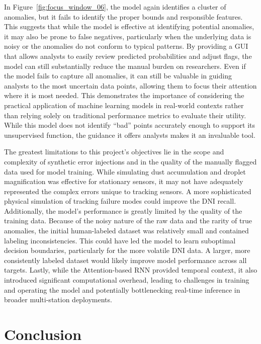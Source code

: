 \documentclass[12pt]{article}
\begin{document}
In Figure~\ref{fig:focus_window_06}, the model again identifies a cluster of anomalies, but it fails to identify the proper bounds and responsible features. This suggests that while the model is effective at identifying potential anomalies, it may also be prone to false negatives, particularly when the underlying data is noisy or the anomalies do not conform to typical patterns. By providing a GUI that allows analysts to easily review predicted probabilities and adjust flags, the model can still substantially reduce the manual burden on researchers. Even if the model fails to capture all anomalies, it can still be valuable in guiding analysts to the most uncertain data points, allowing them to focus their attention where it is most needed. This demonstrates the importance of considering the practical application of machine learning models in real-world contexts rather than relying solely on traditional performance metrics to evaluate their utility. While this model does not identify ``bad'' points accurately enough to support its unsupervised function, the guidance it offers analysts makes it an invaluable tool.

The greatest limitations to this project's objectives lie in the scope and complexity of synthetic error injections and in the quality of the manually flagged data used for model training. While simulating dust accumulation and droplet magnification was effective for stationary sensors, it may not have adequately represented the complex errors unique to tracking sensors. A more sophisticated physical simulation of tracking failure modes could improve the DNI recall. Additionally, the model's performance is greatly limited by the quality of the training data. Because of the noisy nature of the raw data and the rarity of true anomalies, the initial human-labeled dataset was relatively small and contained labeling inconsistencies. This could have led the model to learn suboptimal decision boundaries, particularly for the more volatile DNI data. A larger, more consistently labeled dataset would likely improve model performance across all targets. Lastly, while the Attention-based RNN provided temporal context, it also introduced significant computational overhead, leading to challenges in training and operating the model and potentially bottlenecking real-time inference in broader multi-station deployments.

\section*{Conclusion}
\end{document}
